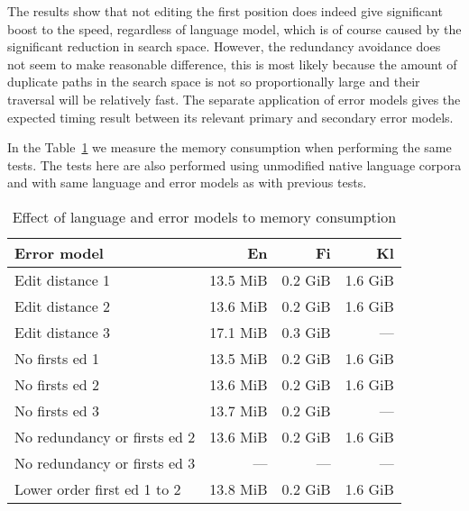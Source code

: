 \documentclass[11pt]{article}
\begin{document}
The results show that not editing the first position does indeed give
significant boost to the speed, regardless of language model, which is of course
caused by the significant reduction in search space. However, the
redundancy avoidance does not seem to make reasonable difference, this is most
likely because the amount of duplicate paths in the search space is not so
proportionally large and their traversal will be relatively fast. The separate
application of error models gives the expected timing result between its
relevant primary and secondary error models.

In the Table~\ref{table:error-model-vs-language-memory} we measure the memory
consumption when performing the same tests. The tests here are also performed
using unmodified native language corpora and with same language and error
models as with previous tests.

\begin{table}[h]
\begin{center}
\begin{scriptsize}
\begin{tabular}{|l|rrr|}
\hline
\bf Error model & \bf En & \bf Fi & \bf Kl \\ 
\hline
Edit distance 1 &
13.5 MiB&0.2 GiB&1.6 GiB
\\
Edit distance 2 &
13.6 MiB&0.2 GiB&1.6 GiB
\\
Edit distance 3 &
17.1 MiB&0.3 GiB&---
\\
No firsts ed 1 & 
13.5 MiB&0.2 GiB&1.6 GiB
\\
No firsts ed 2 &
13.6 MiB&0.2 GiB&1.6 GiB
\\
No firsts ed 3 &
13.7 MiB&0.2 GiB&---
\\
No redundancy or firsts ed 2 &
13.6 MiB&0.2 GiB&1.6 GiB
\\
No redundancy or firsts ed 3 &
---&---&---
\\
Lower order first ed 1 to 2 &
13.8 MiB&0.2 GiB&1.6 GiB
\\
\hline
\end{tabular}
\end{scriptsize}
\end{center}
\caption{\label{table:error-model-vs-language-memory} Effect of language and 
error models to memory consumption}
\end{table}
\end{document}
